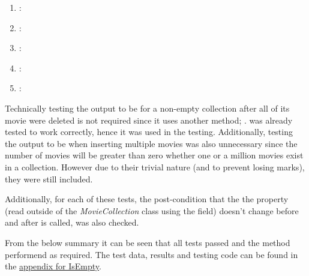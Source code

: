 \documentclass[a4paper]{article}
\begin{document}
\begin{enumerate}
   \item {}: 
   
   \item {}: 
   
   \item {}: 
   
   \item {}:
   
   \item {}: 
   
\end{enumerate}
Technically testing the output to be  for a non-empty collection after all of its movie were deleted is not required since it uses another method; .  was already tested to work correctly, hence it was used in the  testing. Additionally, testing the output to be  when inserting multiple movies was also unnecessary since the number of movies will be greater than zero whether one or a million movies exist in a collection. However due to their trivial nature (and to prevent losing marks), they were still included. 

Additionally, for each of these tests, the post-condition that the the  property (read outside of the \textit{MovieCollection} class using the  field) doesn't change before and after  is called, was also checked.
\vspace{4mm}

\noindent
From the below summary it can be seen that all tests passed and the method performend as required. The test data, results and testing code can be found in the \hyperlink{subsubsection.5.3.1}{appendix for IsEmpty}. 
\vspace{1mm}
\end{document}
